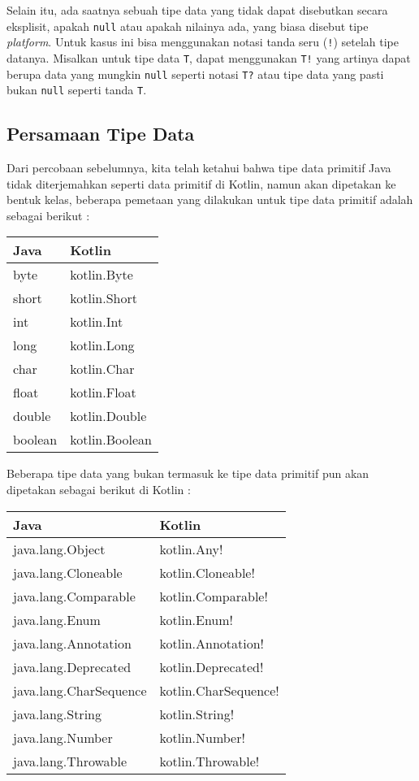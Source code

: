 Selain itu, ada saatnya sebuah tipe data yang tidak dapat disebutkan secara eksplisit, apakah \texttt{null} atau apakah nilainya ada, yang biasa disebut tipe \textit{platform}. Untuk kasus ini bisa menggunakan notasi tanda seru (\texttt{!}) setelah tipe datanya. Misalkan untuk tipe data \texttt{T}, dapat menggunakan \texttt{T!} yang artinya dapat berupa data yang mungkin \texttt{null} seperti notasi \texttt{T?} atau tipe data yang pasti bukan \texttt{null} seperti tanda \texttt{T}.

\subsection{Persamaan Tipe Data}

Dari percobaan sebelumnya, kita telah ketahui bahwa tipe data primitif Java tidak diterjemahkan seperti data primitif di Kotlin, namun akan dipetakan ke bentuk kelas, beberapa pemetaan yang dilakukan untuk tipe data primitif adalah sebagai berikut :

\begin{center}
\begin{tabular}{|l|l|}
\hline
\textbf{Java} & \textbf{Kotlin} \\
\hline
byte & kotlin.Byte \\
\hline
short & kotlin.Short \\
\hline
int & kotlin.Int \\
\hline
long & kotlin.Long \\
\hline
char & kotlin.Char \\
\hline 
float & kotlin.Float \\
\hline
double & kotlin.Double \\
\hline
boolean & kotlin.Boolean \\
\hline
\end{tabular}
\end{center}

Beberapa tipe data yang bukan termasuk ke tipe data primitif pun akan dipetakan sebagai berikut di Kotlin :

\begin{center}
\begin{tabular}{|l|l|}
\hline
\textbf{Java} & \textbf{Kotlin} \\
\hline
java.lang.Object & kotlin.Any! \\
\hline
java.lang.Cloneable & kotlin.Cloneable! \\
\hline
java.lang.Comparable & kotlin.Comparable! \\
\hline
java.lang.Enum & kotlin.Enum! \\
\hline
java.lang.Annotation & kotlin.Annotation! \\
\hline
java.lang.Deprecated & kotlin.Deprecated! \\
\hline
java.lang.CharSequence & kotlin.CharSequence! \\
\hline
java.lang.String & kotlin.String! \\
\hline
java.lang.Number & kotlin.Number! \\
\hline
java.lang.Throwable & kotlin.Throwable! \\
\hline
\end{tabular}
\end{center}

